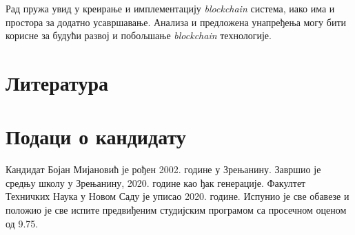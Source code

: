 \documentclass[12pt, a4paper]{article}
\begin{document}
Рад пружа увид у креирање и имплементацију \textit{blockchain} система, иако има и простора за додатно усавршавање. Анализа и предложена унапређења могу бити корисне за будући развој и побољшање \textit{blockchain} технологије.


\pagebreak
\section{Литература}
\renewcommand{\refname}{}
\vspace{-\parskip} %
\vspace{-\parskip} %
\vspace{-\parskip} %
\vspace{-\parskip} %



\pagebreak
\section{Подаци о кандидату}
Кандидат Бојан Мијановић је рођен 2002. године у Зрењанину. Завршио је средњу школу у Зрењанину, 2020. године као ђак генерације. Факултет Техничких Наука у Новом Саду је уписао 2020. године. Испунио је све обавезе и положио је све испите предвиђеним студијским програмом са просечном оценом од 9.75.
\end{document}

